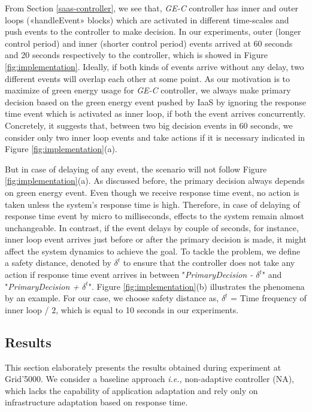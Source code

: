 From Section \ref{saas-controller}, we see that, \emph{GE-C} controller has inner and outer loops («handleEvent» blocks) which are activated in different time-scales and push events to the controller to make decision. In our experiments, outer (longer control period) and inner (shorter control period) events arrived at  60 seconds and 20 seconds respectively to the controller, which is showed in Figure \ref{fig:implementation}. Ideally, if both kinds of events arrive without any delay, two different events will overlap each other at some point. As our motivation is to maximize of green energy usage for \emph{GE-C} controller, we always make primary decision based on the green energy event pushed by IaaS by ignoring the response time event which is activated as inner loop, if both the event arrives concurrently. Concretely, it suggests that, between two big decision events in 60 seconds, we consider only two inner loop events and take actions if it is necessary indicated in Figure \ref{fig:implementation}(a).

But in case of delaying of any event, the scenario will not follow Figure \ref{fig:implementation}(a). As discussed before, the primary decision always depends on green energy event. Even though we receive response time event, no action is taken unless the system's response time is high. Therefore, in case of delaying of response time event by micro to milliseconds, effects to the system remain almost unchangeable. In contrast, if the event delays by couple of seconds, for instance, inner loop event arrives just before or after the primary decision is made, it might affect the system dynamics to achieve the goal. To tackle the problem, we define a safety distance, denoted by $\delta^t$ to ensure that the controller does not take any action if response time event arrives in between "\textit{PrimaryDecision - $\delta^t$}" and "\textit{PrimaryDecision + $\delta^t$}". Figure \ref{fig:implementation}(b) illustrates the phenomena by an example. For our case, we choose safety distance as, $\delta^t$ = Time frequency of inner loop / $2$, which is equal to 10 seconds in our experiments.



\subsection{Results}

This section elaborately presents the results obtained during experiment at Grid'5000. We consider a baseline approach \emph{i.e.,} non-adaptive controller (NA), which lacks the capability of application adaptation and rely only on infrastructure adaptation based on response time.

